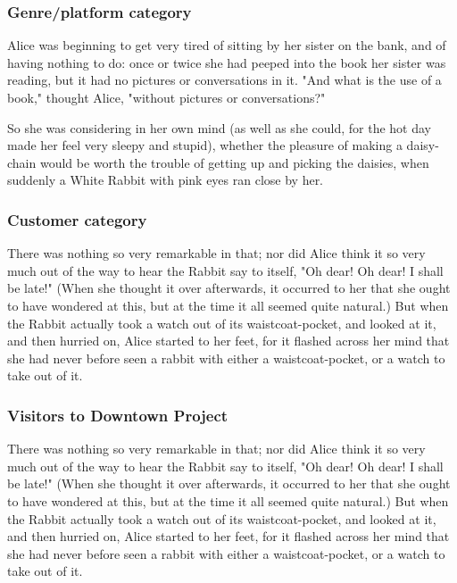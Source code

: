 \documentclass[12pt]{article}
\begin{document}
\subsubsection{Genre/platform category}
\label{sec:orgheadline20}
Alice was beginning to get very tired of sitting by her sister on the bank, and of having nothing to do: once or twice she had peeped into the book her sister was reading, but it had no pictures or conversations in it. "And what is the use of a book," thought Alice, "without pictures or conversations?" 

So she was considering in her own mind (as well as she could, for the hot day made her feel very sleepy and stupid), whether the pleasure of making a daisy-chain would be worth the trouble of getting up and picking the daisies, when suddenly a White Rabbit with pink eyes ran close by her.

\subsubsection{Customer category}
\label{sec:orgheadline21}
There was nothing so very remarkable in that; nor did Alice think it so very much out of the way to hear the Rabbit say to itself, "Oh dear! Oh dear! I shall be late!" (When she thought it over afterwards, it occurred to her that she ought to have wondered at this, but at the time it all seemed quite natural.) But when the Rabbit actually took a watch out of its waistcoat-pocket, and looked at it, and then hurried on, Alice started to her feet, for it flashed across her mind that she had never before seen a rabbit with either a waistcoat-pocket, or a watch to take out of it. 

\subsubsection{Visitors to Downtown Project}
\label{sec:orgheadline22}
There was nothing so very remarkable in that; nor did Alice think it so very much out of the way to hear the Rabbit say to itself, "Oh dear! Oh dear! I shall be late!" (When she thought it over afterwards, it occurred to her that she ought to have wondered at this, but at the time it all seemed quite natural.) But when the Rabbit actually took a watch out of its waistcoat-pocket, and looked at it, and then hurried on, Alice started to her feet, for it flashed across her mind that she had never before seen a rabbit with either a waistcoat-pocket, or a watch to take out of it. 
\end{document}
